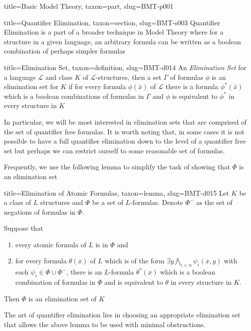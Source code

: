 \documentclass[a4paper]{article}
\begin{document}
\begin{tree}{title={Basic Model Theory}, taxon={part}, slug={BMT-p001}}
\begin{tree}{title={Quantifier Elimination}, taxon={section}, slug={BMT-s003}}
Quantifier Elimination is a part of a broader technique in Model Theory where for a structure in a given language, an arbitrary formula can be written as a boolean combination of perhaps simpler formulas
\begin{tree}{title={Elimination Set}, taxon={definition}, slug={BMT-d014}}
An \emph{Elimination Set} for a language \(\mathcal {L}\) and class \(K\) of \(\mathcal {L}\)-structures, then a set \(\Gamma\) of formulas \(\phi\) is an elimination set for \(K\) if for every formula \(\phi ( \bar {x})\) of \(\mathcal {L}\) there is a formula \(\phi ^*( \bar {x})\) which is a boolean combinations of formulas in \(\Gamma\) and \(\phi\) is equivalent to \(\phi ^*\) in every structure in \(K\)
\end{tree}
\par{In particular, we will be most interested in elimination sets that are comprised of the set of quantifier free formulas. It is worth noting that, in some cases it is not possible to have a full quantifier elimination down to the level of a quantifier free set but perhaps we can restrict ourself to some reasonable set of formulas.}\par{Frequently, we use the following lemma to simplify the task of showing that \(\Phi\) is an elimination set}
\begin{tree}{title={Elimination of Atomic Formulas}, taxon={lemma}, slug={BMT-d015}}
Let \(K\) be a class of \(L\) structures and \(\Phi\) be a set of \(L\)-formulas. Denote \(\Phi ^-\) as the set of negations of formulas in \(\Phi\).\par{Suppose that 
  \begin{enumerate}
\item{every atomic formula of \(L\) is in \(\Phi\) and} 
    \item{for every formula \(\theta ( \overline {x})\) of \(L\) which is of the form \(\exists  y  \bigwedge _{i<n}  \psi _i ( \overline {x},y)\) with each \(\psi _i  \in   \Phi \cup   \Phi ^-\), there is an \(L\)-formula \(\theta ^*( \overline {x})\) which is a boolean combination of formulas in \(\Phi\) and is equivalent to \(\theta\) in every structure in \(K\).}
\end{enumerate}
  Then \(\Phi\) is an elimination set of \(K\)}
\end{tree}
\par{The art of quantifier elimination lies in choosing an appropriate elimination set that allows the above lemma to be used with minimal obstructions. }
\end{tree}



\end{tree}
\end{document}
